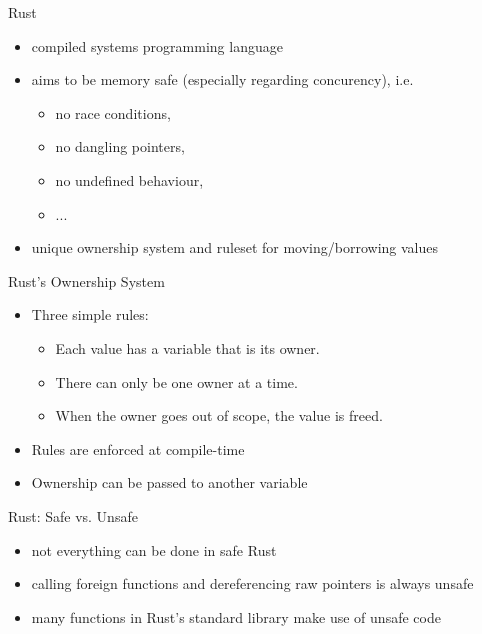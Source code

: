 \documentclass[NET,english,aspectratio=169,notitleframe]{tumbeamer}
\begin{document}
\begin{frame}{Rust}
\begin{itemize}
\item compiled systems programming language
\item aims to be memory safe (especially regarding concurency), i.e.
\begin{itemize}
\item no race conditions,
\item no dangling pointers,
\item no undefined behaviour,
\item ...
\end{itemize}
\item unique ownership system and ruleset for moving/borrowing values
\end{itemize}
\end{frame}

\begin{frame}{Rust's Ownership System}
\begin{itemize}
\item Three simple rules:
\begin{itemize}
\item Each value has a variable that is its owner.
\item There can only be one owner at a time.
\item When the owner goes out of scope, the value is freed.
\end{itemize}
\item Rules are enforced at compile-time
\item Ownership can be passed to another variable%
\end{itemize}
\end{frame}

\begin{frame}{Rust: Safe vs. Unsafe}
\begin{itemize}
\item not everything can be done in safe Rust
\item calling foreign functions and dereferencing raw pointers is always unsafe
\item many functions in Rust's standard library make use of unsafe code
\end{itemize}
\end{frame}
\end{document}
